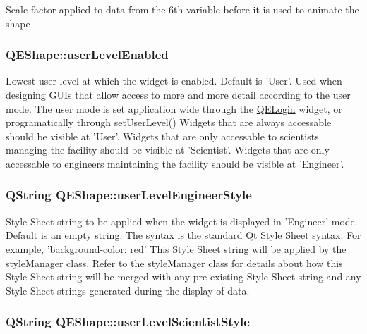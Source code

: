 \label{classQEShape_a381195400bee141aea3ec023a686351b}
Scale factor applied to data from the 6th variable before it is used to animate the shape \hypertarget{classQEShape_a8b2158632ac9f2cd70692650c3cd594f}{
\subsubsection[{userLevelEnabled}]{ QEShape::userLevelEnabled}}
\label{classQEShape_a8b2158632ac9f2cd70692650c3cd594f}
Lowest user level at which the widget is enabled. Default is 'User'. Used when designing GUIs that allow access to more and more detail according to the user mode. The user mode is set application wide through the \hyperlink{classQELogin}{QELogin} widget, or programatically through setUserLevel() Widgets that are always accessable should be visible at 'User'. Widgets that are only accessable to scientists managing the facility should be visible at 'Scientist'. Widgets that are only accessable to engineers maintaining the facility should be visible at 'Engineer'. \hypertarget{classQEShape_a8a26fa66369d3e3e6f9e308e2ebaa74d}{
\subsubsection[{userLevelEngineerStyle}]{\setlength{\rightskip}{0pt plus 5cm}QString QEShape::userLevelEngineerStyle}}
\label{classQEShape_a8a26fa66369d3e3e6f9e308e2ebaa74d}
Style Sheet string to be applied when the widget is displayed in 'Engineer' mode. Default is an empty string. The syntax is the standard Qt Style Sheet syntax. For example, 'background-\/color: red' This Style Sheet string will be applied by the styleManager class. Refer to the styleManager class for details about how this Style Sheet string will be merged with any pre-\/existing Style Sheet string and any Style Sheet strings generated during the display of data. \hypertarget{classQEShape_aa71e87349e8754ca870dac8509563ffd}{
\subsubsection[{userLevelScientistStyle}]{\setlength{\rightskip}{0pt plus 5cm}QString QEShape::userLevelScientistStyle}}
